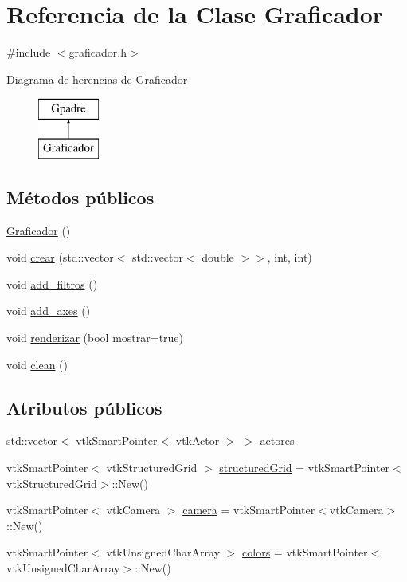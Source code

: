 \hypertarget{class_graficador}{}\section{Referencia de la Clase Graficador}
\label{class_graficador}


{\ttfamily \#include $<$graficador.\+h$>$}

Diagrama de herencias de Graficador\begin{figure}[H]
\begin{center}
\leavevmode
\includegraphics[height=2.000000cm]{class_graficador}
\end{center}
\end{figure}
\subsection*{Métodos públicos}
\begin{DoxyCompactItemize}
\item 
\hyperlink{class_graficador_a62158abce60f946c3fd7893f2689e138}{Graficador} ()
\item 
void \hyperlink{class_graficador_a099289e888f91f94e377fd26d4cefaca}{crear} (std\+::vector$<$ std\+::vector$<$ double $>$$>$, int, int)
\item 
void \hyperlink{class_graficador_a799d3f27e186e07c2841aa8edbbf641f}{add\+\_\+filtros} ()
\item 
void \hyperlink{class_graficador_a47a1e61b68a8e1d346c2b0d21ff11d01}{add\+\_\+axes} ()
\item 
void \hyperlink{class_graficador_a74fa4bf9dff4b44b521a04a1cc0200a5}{renderizar} (bool mostrar=true)
\item 
void \hyperlink{class_graficador_a70f37ffd12170c31155c44f2aea11b93}{clean} ()
\end{DoxyCompactItemize}
\subsection*{Atributos públicos}
\begin{DoxyCompactItemize}
\item 
std\+::vector$<$ vtk\+Smart\+Pointer$<$ vtk\+Actor $>$ $>$ \hyperlink{class_graficador_af324352821c6e39961ed6977e50e9582}{actores}
\item 
vtk\+Smart\+Pointer$<$ vtk\+Structured\+Grid $>$ \hyperlink{class_graficador_aeb8321dafc848939f900bea4721142da}{structured\+Grid} = vtk\+Smart\+Pointer$<$vtk\+Structured\+Grid$>$\+::New()
\item 
vtk\+Smart\+Pointer$<$ vtk\+Camera $>$ \hyperlink{class_graficador_aeb158420087549f052e29a6739ea2f75}{camera} = vtk\+Smart\+Pointer$<$vtk\+Camera$>$\+::New()
\item 
vtk\+Smart\+Pointer$<$ vtk\+Unsigned\+Char\+Array $>$ \hyperlink{class_graficador_a48b78d03ae2e04e5032ed685f8fd8643}{colors} = vtk\+Smart\+Pointer$<$vtk\+Unsigned\+Char\+Array$>$\+::New()
\end{DoxyCompactItemize}
